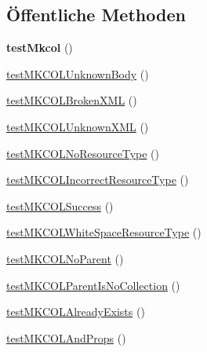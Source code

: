\subsection*{Öffentliche Methoden}
\begin{DoxyCompactItemize}
\item 
\mbox{\label{class_sabre_1_1_d_a_v_1_1_server_m_k_c_o_l_test_a55f2b547d7b712bb72ee2456cfb09bec}} 
{\bfseries test\+Mkcol} ()
\item 
\mbox{\hyperlink{class_sabre_1_1_d_a_v_1_1_server_m_k_c_o_l_test_a3679e8364862ca764eede73fffa6ea3e}{test\+M\+K\+C\+O\+L\+Unknown\+Body}} ()
\item 
\mbox{\hyperlink{class_sabre_1_1_d_a_v_1_1_server_m_k_c_o_l_test_a4bbfaa19592963790606c27b16d60bc3}{test\+M\+K\+C\+O\+L\+Broken\+X\+ML}} ()
\item 
\mbox{\hyperlink{class_sabre_1_1_d_a_v_1_1_server_m_k_c_o_l_test_a61aeb2df93a99e16a880ed6f19f9a090}{test\+M\+K\+C\+O\+L\+Unknown\+X\+ML}} ()
\item 
\mbox{\hyperlink{class_sabre_1_1_d_a_v_1_1_server_m_k_c_o_l_test_a44de42985dab8eda14fbc60ea3bc3b68}{test\+M\+K\+C\+O\+L\+No\+Resource\+Type}} ()
\item 
\mbox{\hyperlink{class_sabre_1_1_d_a_v_1_1_server_m_k_c_o_l_test_ade069c8f8bb1b2ee974f2949b21e4197}{test\+M\+K\+C\+O\+L\+Incorrect\+Resource\+Type}} ()
\item 
\mbox{\hyperlink{class_sabre_1_1_d_a_v_1_1_server_m_k_c_o_l_test_afc4a828641946783d739e6f51c6f1a7f}{test\+M\+K\+C\+O\+L\+Success}} ()
\item 
\mbox{\hyperlink{class_sabre_1_1_d_a_v_1_1_server_m_k_c_o_l_test_a3b0f3601eb25e55043eeac15a90c8cdf}{test\+M\+K\+C\+O\+L\+White\+Space\+Resource\+Type}} ()
\item 
\mbox{\hyperlink{class_sabre_1_1_d_a_v_1_1_server_m_k_c_o_l_test_a69db8d3bfe02631420a20596c1216783}{test\+M\+K\+C\+O\+L\+No\+Parent}} ()
\item 
\mbox{\hyperlink{class_sabre_1_1_d_a_v_1_1_server_m_k_c_o_l_test_ac0d92c550d6b1e099eee0b32950b98ed}{test\+M\+K\+C\+O\+L\+Parent\+Is\+No\+Collection}} ()
\item 
\mbox{\hyperlink{class_sabre_1_1_d_a_v_1_1_server_m_k_c_o_l_test_aac954323f1b5836c12b12492cf52f4da}{test\+M\+K\+C\+O\+L\+Already\+Exists}} ()
\item 
\mbox{\hyperlink{class_sabre_1_1_d_a_v_1_1_server_m_k_c_o_l_test_aab3f2d36cd1bc227119a6ed1415de27c}{test\+M\+K\+C\+O\+L\+And\+Props}} ()
\end{DoxyCompactItemize}
